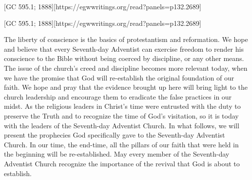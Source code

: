 [GC 595.1; 1888][https://egwwritings.org/read?panels=p132.2689]


[GC 595.1; 1888][https://egwwritings.org/read?panels=p132.2689]


The liberty of conscience is the basics of protestantism and reformation. We hope and believe that every Seventh-day Adventist can exercise freedom to render his conscience to the Bible without being coerced by discipline, or any other means. The issue of the church's creed and discipline becomes more relevant today, when we have the promise that God will re-establish the original foundation of our faith. We hope and pray that the evidence brought up here will bring light to the church leadership and encourage them to eradicate the false practices in our midst. As the religious leaders in Christ’s time were entrusted with the duty to preserve the Truth and to recognize the time of God’s visitation, so it is today with the leaders of the Seventh-day Adventist Church. In what follows, we will present the prophecies God specifically gave to the Seventh-day Adventist Church. In our time, the end-time, all the pillars of our faith that were held in the beginning will be re-established. May every member of the Seventh-day Adventist Church recognize the importance of the revival that God is about to establish.


